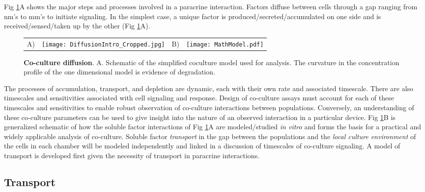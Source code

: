Fig \ref{chap1:fig:cocultureSchematic}A shows the major steps and processes involved in a paracrine interaction. Factors diffuse between cells through a gap ranging from nm's to mm's to initiate signaling. In the simplest case, a unique factor is produced\slash secreted\slash accumulated on one side and is received\slash sensed\slash taken up by the other (Fig \ref{chap1:fig:cocultureSchematic}A). 
\begin{figure}[!b]
\centering
\begin{tabular}{p{0.3cm}cp{0.3cm}c}
A)&\texttt{[image: DiffusionIntro\_Cropped.jpg]}&B)&\texttt{[image: MathModel.pdf]}
\end{tabular}
\caption{\textbf{Co-culture diffusion}. A. Schematic of the simplified coculture model used for analysis. The curvature in the concentration profile of the one dimensional model is evidence of degradation.}
\label{chap1:fig:cocultureSchematic}
\end{figure}
The processes of accumulation, transport, and depletion are dynamic, each with their own rate and associated timescale. There are also timescales and sensitivities associated with cell signaling and response. Design of co-culture assays must account for each of these timescales and sensitivities to enable robust observation of co-culture interactions between populations. Conversely, an understanding of these co-culture parameters can be used to give insight into the nature of an observed interaction in a particular device. Fig \ref{chap1:fig:cocultureSchematic}B is generalized schematic of how the soluble factor interactions of Fig \ref{chap1:fig:cocultureSchematic}A are modeled\slash studied \emph{in vitro} and forms the basis for a practical and widely applicable analysis of co-culture. Soluble factor \emph{transport} in the gap between the populations and the \emph{local culture environment} of the cells in each chamber will be modeled independently and linked in a discussion of timescales of co-culture signaling. A model of transport is developed first given the necessity of transport in paracrine interactions.

\subsection{Transport}
